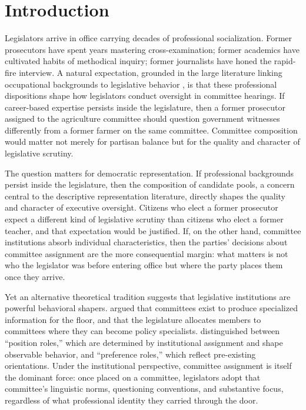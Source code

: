 \documentclass[11pt]{article}
\begin{document}
\section{Introduction}
\label{sec:intro}

Legislators arrive in office carrying decades of professional socialization. Former prosecutors have spent years mastering cross-examination; former academics have cultivated habits of methodical inquiry; former journalists have honed the rapid-fire interview. A natural expectation, grounded in the large literature linking occupational backgrounds to legislative behavior \citep{carnes2023}, is that these professional dispositions shape how legislators conduct oversight in committee hearings. If career-based expertise persists inside the legislature, then a former prosecutor assigned to the agriculture committee should question government witnesses differently from a former farmer on the same committee. Committee composition would matter not merely for partisan balance but for the quality and character of legislative scrutiny.

The question matters for democratic representation. If professional backgrounds persist inside the legislature, then the composition of candidate pools, a concern central to the descriptive representation literature, directly shapes the quality and character of executive oversight. Citizens who elect a former prosecutor expect a different kind of legislative scrutiny than citizens who elect a former teacher, and that expectation would be justified. If, on the other hand, committee institutions absorb individual characteristics, then the parties' decisions about committee assignment are the more consequential margin: what matters is not who the legislator was before entering office but where the party places them once they arrive.

Yet an alternative theoretical tradition suggests that legislative institutions are powerful behavioral shapers. \citet{krehbiel1991} argued that committees exist to produce specialized information for the floor, and that the legislature allocates members to committees where they can become policy specialists. \citet{searing1994} distinguished between ``position roles,'' which are determined by institutional assignment and shape observable behavior, and ``preference roles,'' which reflect pre-existing orientations. Under the institutional perspective, committee assignment is itself the dominant force: once placed on a committee, legislators adopt that committee's linguistic norms, questioning conventions, and substantive focus, regardless of what professional identity they carried through the door.
\end{document}
